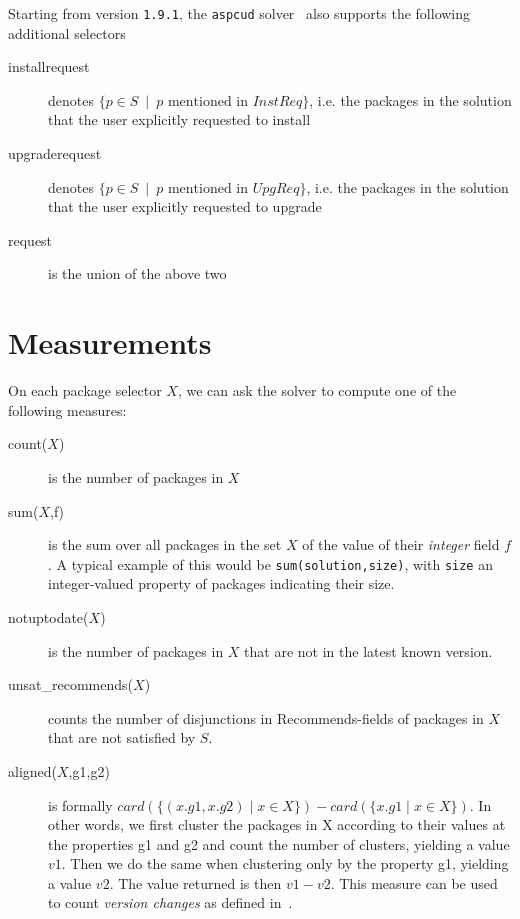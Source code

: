 \documentclass{article}
\begin{document}
Starting from version \texttt{1.9.1}, the \texttt{aspcud} solver~\cite{aspcud-2011} also supports the following additional selectors

\begin{description}
  \item[installrequest] denotes $\{ p\in S ~\mid~  p \mbox{ mentioned in } InstReq\}$, i.e. the packages in the solution
    that the user explicitly requested to install
  \item[upgraderequest] denotes $\{ p\in S ~\mid~  p \mbox{ mentioned in } UpgReq\}$, i.e. the packages in the solution
    that the user explicitly requested to upgrade
  \item[request] is the union of the above two
\end{description}

\section{Measurements}

On each package selector $X$, we can ask the solver to compute one of the following measures:

\begin{description}
\item[count($X$)] is the number of packages in $X$
\item[sum($X$,f)] is the sum over all packages in the set $X$ of the value of their \emph{integer} field $f$.
                A typical example of this would be \texttt{sum(solution,size)}, with \texttt{size} an 
                integer-valued property of packages indicating their size.
\item[notuptodate($X$)] is the number of packages in $X$ that are not in the latest known version.
\item[unsat\_recommends($X$)] counts the number of disjunctions in Recommends-fields of packages in $X$ that are not satisfied by $S$.
\item[aligned($X$,g1,g2)] is formally $card(\{ (x.g1,x.g2) \mid x \in X \}) - card(\{ x.g1 \mid x \in X \})$.
        In other words, we first cluster the packages in X according to their values at the properties g1 and g2 and count the number of clusters, yielding a value $v1$. Then we do the same when clustering only by the property g1, yielding a value $v2$. The value returned is then $v1-v2$. 
This measure can be used to count \emph{version changes} as defined in~\cite{AlignedUpgrades2011}.
\end{description}
      
\end{document}
